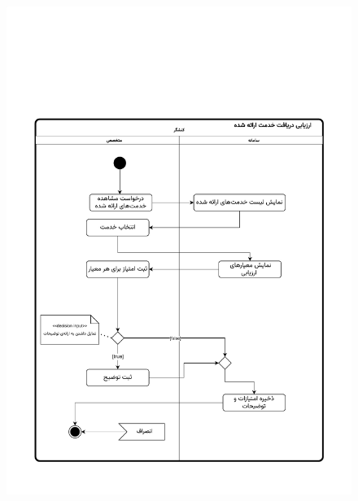 \begin{figure}[ht!]
	\centering
	\includegraphics[scale=0.8, page=1]{figs/OOD-activity-evaluatereqsent.pdf}
\end{figure}
\FloatBarrier
\newpage

